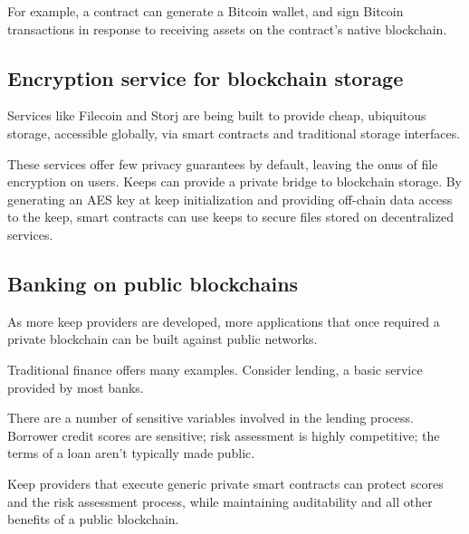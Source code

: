 \documentclass[11pt]{article}
\begin{document}
For example, a contract can generate a Bitcoin wallet, and sign
Bitcoin transactions in response to receiving assets on the contract's
native blockchain.

\subsection{Encryption service for blockchain storage}

Services like Filecoin \cite{filecoin} and Storj \cite{storj} are
being built to provide cheap, ubiquitous storage, accessible globally,
via smart contracts and traditional storage interfaces.

These services offer few privacy guarantees by default, leaving the
onus of file encryption on users. Keeps can provide a private bridge
to blockchain storage. By generating an AES key at keep initialization
and providing off-chain data access to the keep, smart contracts can
use keeps to secure files stored on decentralized services.

\subsection{Banking on public blockchains}

As more keep providers are developed, more applications that once
required a private blockchain can be built against public networks.

Traditional finance offers many examples. Consider lending, a basic
service provided by most banks.

There are a number of sensitive variables involved in the lending
process. Borrower credit scores are sensitive; risk assessment is
highly competitive; the terms of a loan aren't typically made public.

Keep providers that execute generic private smart contracts can
protect scores and the risk assessment process, while maintaining
auditability and all other benefits of a public blockchain.


{}
\end{document}
